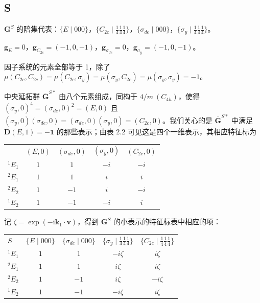 \subsection*{S}

$\mathbf{G}^{S}$ 的陪集代表：$\{E \mid 000\}$，$\{C_{2c} \mid {\frac{1}{4}}{\frac{1}{4}}{\frac{1}{4}}\}$，$\{\sigma_{de} \mid 000\}$，$\{\sigma_{y} \mid {\frac{1}{4}}{\frac{1}{4}}{\frac{1}{4}}\}$。

\begin{center}
$\mathbf{g}_{E} = 0$，$\mathbf{g}_{C_{2c}} = (-1, 0, -1)$，$\mathbf{g}_{\sigma_{de}} = 0$，$\mathbf{g}_{\sigma_{y}} = (-1, 0, -1)$。
\end{center}

因子系统的元素全部等于 1，除了 $\mu(C_{2c}, C_{2c}) = \mu(C_{2c}, \sigma_{y}) = \mu(\sigma_{y}, C_{2c}) = \mu(\sigma_{y}, \sigma_{y}) = -1$。

中央延拓群 $\overline{\mathbf{G}}^{S*}$ 由八个元素组成，同构于 $4/m\ (C_{4h})$，使得 $(\sigma_{y}, 0)^{4} = (\sigma_{de}, 0)^{2} = (E, 0)$ 且 $(\sigma_{y}, 0)(\sigma_{de}, 0) = (\sigma_{de}, 0)(\sigma_{y}, 0) = (C_{2c}, 0)$。我们关心的是 $\overline{\mathbf{G}}^{S*}$ 中满足 $\mathbf{D}(E, 1) = -\mathbf{1}$ 的那些表示；由表 2.2 可见这是四个一维表示，其相应特征标为
\begin{center}
\begin{tabular}{lcccc}
 & $(E, 0)$ & $(\sigma_{de}, 0)$ & $(\sigma_{y}, 0)$ & $(C_{2c}, 0)$\\
${}^{1}E_{1}$ & $1$ & $1$ & $-i$ & $-i$\\
${}^{2}E_{1}$ & $1$ & $1$ & $i$ & $i$\\
${}^{2}E_{2}$ & $1$ & $-1$ & $i$ & $-i$\\
${}^{1}E_{2}$ & $1$ & $-1$ & $-i$ & $i$
\end{tabular}
\end{center}
记 $\zeta = \exp(-\mathrm{i}\mathbf{k}_{1} \cdot \mathbf{v})$，得到 $\mathbf{G}^{S}$ 的小表示的特征标表中相应的项：
\begin{center}
\begin{tabular}{lcccc}
$S$ & $\{E \mid 000\}$ & $\{\sigma_{de} \mid 000\}$ & $\{\sigma_{y} \mid {\frac{1}{4}}{\frac{1}{4}}{\frac{1}{4}}\}$ & $\{C_{2c} \mid {\frac{1}{4}}{\frac{1}{4}}{\frac{1}{4}}\}$\\
${}^{1}E_{1}$ & $1$ & $1$ & $-i\zeta$ & $i\zeta$\\
${}^{2}E_{1}$ & $1$ & $1$ & $i\zeta$ & $i\zeta$\\
${}^{2}E_{2}$ & $1$ & $-1$ & $i\zeta$ & $-i\zeta$\\
${}^{1}E_{2}$ & $1$ & $-1$ & $-i\zeta$ & $i\zeta$
\end{tabular}
\end{center}

